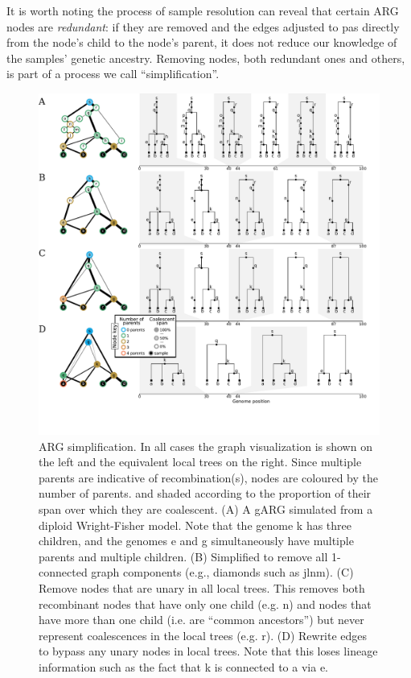 \documentclass{article}
\begin{document}
It is worth noting the process of sample resolution can reveal that certain ARG
nodes are \emph{redundant}: if they are removed and the edges adjusted to
pas directly from the node's child to the node's parent, it does not reduce our
knowledge of the samples' genetic ancestry. Removing nodes,
both redundant ones and others, is part of a process we call
``simplification''.

\begin{figure}
\centering
\vspace{5em}
\includegraphics[width=\linewidth]{illustrations/simplification}
\caption{\label{fig-simplification}
ARG simplification. In all cases the graph visualization is shown on the left
and the equivalent local trees on the right. Since multiple parents are indicative of
recombination(s), nodes are coloured by the number of parents. and shaded
according to the proportion of their span over which they are coalescent.
(A) A gARG simulated from a diploid Wright-Fisher
model. Note that the genome \textsf{k} has three children, and the genomes
\textsf{e} and \textsf{g} simultaneously have multiple parents and multiple
children.
(B) Simplified to remove all
1-connected graph components (e.g., diamonds such as \textsf{jlnm}).
(C) Remove nodes that are unary in all local trees. This removes both recombinant nodes
that have only one child (e.g. \textsf{n}) and nodes that have more
than one child (i.e. are ``common ancestors'') but never represent coalescences
in the local trees (e.g. \textsf{r}).
(D) Rewrite edges to bypass any unary nodes in local trees. Note that this loses lineage
information such as the fact that \textsf{k} is connected to \textsf{a} via \textsf{e}.
}
\end{figure}
\end{document}
